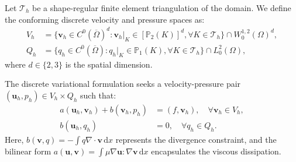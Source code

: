 \documentclass{elsarticle}
\begin{document}
Let $\mathcal{T}_h$ be a shape-regular finite element triangulation of the domain. We define the conforming discrete velocity and pressure spaces as:
\begin{align}
    V_h & = \{ \mathbf{v}_h \in C^0(\overline{\Omega})^d : \mathbf{v}_h|_K \in [\mathbb{P}_2(K)]^d, \forall K \in \mathcal{T}_h \} \cap W_0^{1,2}(\Omega)^d, \\
    Q_h & = \{ q_h \in C^0(\overline{\Omega}) : q_h|_K \in \mathbb{P}_1(K), \forall K \in \mathcal{T}_h \} \cap L_0^2(\Omega),
\end{align}
where $d \in \{2, 3\}$ is the spatial dimension.

The discrete variational formulation seeks a velocity-pressure pair $(\mathbf{u}_h, p_h) \in V_h \times Q_h$ such that:
\begin{align}
    a(\mathbf{u}_h, \mathbf{v}_h) + b(\mathbf{v}_h, p_h) & = (f, \mathbf{v}_h), \quad \forall \mathbf{v}_h \in V_h, \\
    b(\mathbf{u}_h, q_h)                                 & = 0, \quad \forall q_h \in Q_h.
\end{align}
Here, $b(\mathbf{v}, q) = -\int q \nabla \cdot \mathbf{v} \, \mathrm{d}x$ represents the divergence constraint, and the bilinear form $a(\mathbf{u}, \mathbf{v}) = \int \mu \nabla \mathbf{u} : \nabla \mathbf{v} \, \mathrm{d}x$ encapsulates the viscous dissipation.
\end{document}
